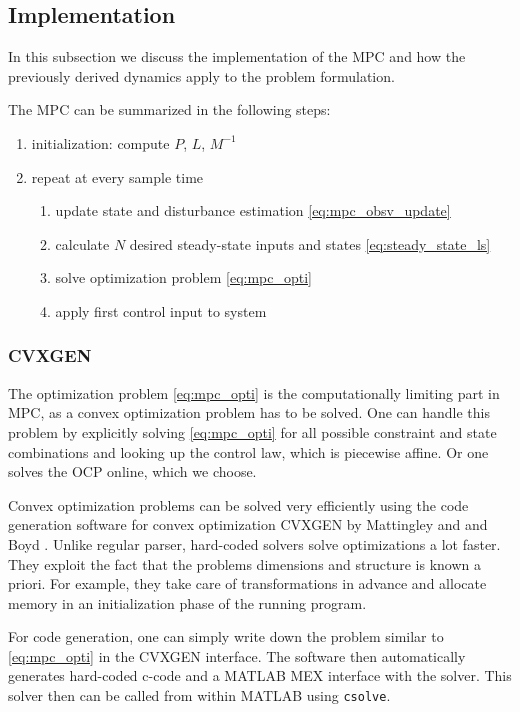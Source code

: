 \subsection{Implementation}
In this subsection we discuss the implementation of the MPC and how the previously derived dynamics apply to the problem formulation.

The MPC can be summarized in the following steps:
\begin{enumerate}
\item initialization: compute $P$, $L$, $M^{-1}$
\item repeat at every sample time
\begin{enumerate}
\item update state and disturbance estimation \ref{eq:mpc_obsv_update} \label{enum:mpc_start}
\item calculate $N$ desired steady-state inputs and states \ref{eq:steady_state_ls}
\item solve optimization problem \ref{eq:mpc_opti}
\item apply first control input to system \label{enum:mpc_finish}
\end{enumerate}
\end{enumerate}

\subsubsection{CVXGEN}
The optimization problem \ref{eq:mpc_opti} is the computationally limiting part in MPC, as a convex optimization problem has to be solved. One can handle this problem by explicitly solving \ref{eq:mpc_opti} for all possible constraint and state combinations and looking up the control law, which is piecewise affine. Or one solves the OCP online, which we choose.

Convex optimization problems can be solved very efficiently using the code generation software for convex optimization CVXGEN by Mattingley and and Boyd \cite{Mattingley2010}. Unlike regular parser, hard-coded solvers solve optimizations a lot faster. They exploit the fact that the problems dimensions and structure is known a priori. For example, they take care of transformations in advance and allocate memory in an initialization phase of the running program.

For code generation, one can simply write down the problem similar to \ref{eq:mpc_opti} in the CVXGEN interface. The software then automatically generates hard-coded c-code and a MATLAB MEX interface with the solver. This solver then can be called from within MATLAB using \texttt{csolve}.

